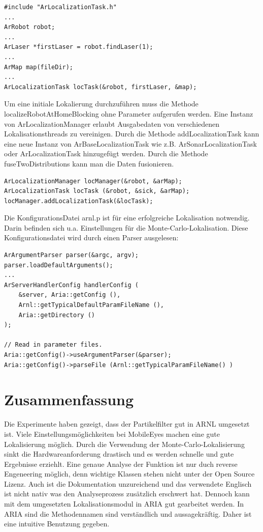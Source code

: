 \documentclass{article}
\begin{document}
\lstset{language=C++}
\begin{lstlisting}
#include "ArLocalizationTask.h"
...
ArRobot robot;
...
ArLaser *firstLaser = robot.findLaser(1);
...
ArMap map(fileDir);
...
ArLocalizationTask locTask(&robot, firstLaser, &map);
\end{lstlisting}
Um eine initiale Lokalierung durchzuf\"uhren muss die Methode localizeRobotAtHomeBlocking ohne Parameter aufgerufen werden.
Eine Instanz von ArLocalizationManager erlaubt Ausgabedaten von verschiedenen Lokalisationsthreads zu vereinigen. Durch die Methode addLocalizationTask kann eine neue Instanz von ArBaseLocalizationTask wie z.B. ArSonarLocalizationTask oder ArLocalizationTask hinzugef\"ugt werden. Durch die Methode fuseTwoDistributions kann man die Daten fusionieren.
\lstset{language=C++}
\begin{lstlisting}
ArLocalizationManager locManager(&robot, &arMap);
ArLocalizationTask locTask (&robot, &sick, &arMap);
locManager.addLocalizationTask(&locTask);
\end{lstlisting}

Die KonfigurationsDatei arnl.p ist f\"ur eine erfolgreiche Lokalisation notwendig. Darin befinden sich u.a. Einstellungen f\"ur die Monte-Carlo-Lokalisation.
Diese Konfigurationsdatei wird durch einen Parser ausgelesen:

\lstset{language=C++}
\begin{lstlisting}
ArArgumentParser parser(&argc, argv);
parser.loadDefaultArguments();
... 
ArServerHandlerConfig handlerConfig (
	&server, Aria::getConfig (),
	Arnl::getTypicalDefaultParamFileName (),
	Aria::getDirectory ()
);

// Read in parameter files.
Aria::getConfig()->useArgumentParser(&parser);
Aria::getConfig()->parseFile (Arnl::getTypicalParamFileName() )
\end{lstlisting}



\section{Zusammenfassung}

Die Experimente haben gezeigt, dass der Partikelfilter gut in ARNL umgesetzt ist. Viele Einstellungsm\"oglichkeiten bei MobileEyes machen eine gute Lokalisierung m\"oglich. Durch die Verwendung der Monte-Carlo-Lokalisierung sinkt die Hardwareanforderung drastisch und es werden schnelle und gute Ergebnisse erziehlt. Eine genaue Analyse der Funktion ist nur duch reverse Engeneering m\"oglich, denn wichtige Klassen stehen nicht unter der Open Source Lizenz. Auch ist die Dokumentation unzureichend und das verwendete Englisch ist nicht nativ was den Analyseprozess zus\"atzlich erschwert hat. 
Dennoch kann mit dem umgesetzten Lokalisationsmodul in ARIA gut gearbeitet werden.
In ARIA sind die Methodennamen sind verst\"andlich und aussagekr\"aftig. Daher ist eine intuitive Benutzung gegeben.
\end{document}
